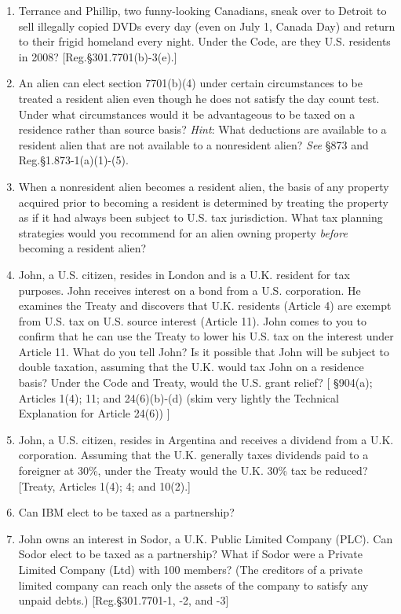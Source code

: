 \begin{enumerate}
		\item Terrance and Phillip, two funny-looking Canadians, sneak over to Detroit to sell illegally copied DVDs every day (even on July 1, Canada Day) and return to their frigid homeland every night.  Under the Code, are they U.S. residents in 2008? [Reg.\@ \S 301.7701(b)-3(e).]
		
		\item An alien can elect section 7701(b)(4) under certain circumstances to be treated a resident alien even though he does not satisfy the day count test.  Under what circumstances would it be advantageous to be taxed on a residence rather than source basis?  \emph{Hint}: What deductions are available to a resident alien that are not available to a nonresident alien?  \emph{See} \S873 and Reg.\@ \S 1.873-1(a)(1)-(5).
		
		\item When a nonresident alien becomes a resident alien, the basis of any property acquired prior to becoming a resident is determined by treating the property as if it had always been subject to U.S. tax jurisdiction.  What tax planning strategies would you recommend for an alien owning property \emph{before} becoming a resident alien? 
	
	\item John, a U.S. citizen, resides in London and is a U.K. resident for tax purposes.  John receives interest on a bond from a U.S. corporation.  He examines the Treaty and discovers that U.K. residents (Article 4) are exempt from U.S. tax on U.S. source interest (Article 11).  John comes to you to confirm that he can use the Treaty to lower his U.S. tax on the interest under Article 11.  What do you tell John?  Is it possible that John will be subject to double taxation, assuming that the U.K. would tax John on a residence basis?  Under the Code and Treaty, would the U.S. grant relief?  [ \S 904(a); Articles 1(4); 11; and 24(6)(b)-(d) (skim very lightly the Technical Explanation for Article 24(6)) ]
		
	\item John, a U.S. citizen, resides in Argentina and receives a dividend from a U.K. corporation.  Assuming that the U.K. generally taxes dividends paid to a foreigner at 30\%, under the Treaty would the U.K. 30\% tax be reduced?  [Treaty, Articles 1(4); 4; and 10(2).]  
	
	\item Can IBM elect to be taxed as a partnership?  
	
	\item John owns an interest in Sodor, a U.K. Public Limited Company (PLC).  Can Sodor elect to be taxed as a partnership?  What if Sodor were a Private Limited Company (Ltd) with 100 members?  (The creditors of a private limited company can reach only the assets of the company to satisfy any unpaid debts.) [Reg.\@ \S 301.7701-1, -2, and -3]
	

\end{enumerate}
